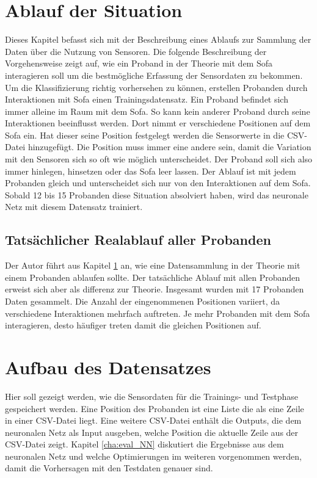 \section{Ablauf der Situation}
\label{sec:abl}
Dieses Kapitel befasst sich mit der Beschreibung eines Ablaufs zur Sammlung der Daten über die Nutzung von Sensoren. Die folgende Beschreibung der Vorgehensweise zeigt auf, wie ein Proband in der Theorie mit dem Sofa interagieren soll um die bestmögliche Erfassung der Sensordaten zu bekommen.
\newline
\newline
Um die Klassifizierung richtig vorhersehen zu können, erstellen Probanden durch Interaktionen mit Sofa einen Trainingsdatensatz. Ein Proband befindet sich immer alleine im Raum mit dem Sofa. So kann kein anderer Proband durch seine Interaktionen beeinflusst werden. Dort nimmt er verschiedene Positionen auf dem Sofa ein. Hat dieser seine Position festgelegt werden die Sensorwerte in die CSV-Datei hinzugefügt. Die Position muss immer eine andere sein, damit die Variation mit den Sensoren sich so oft wie möglich unterscheidet. Der Proband soll sich also immer hinlegen, hinsetzen oder das Sofa leer lassen. Der Ablauf ist mit jedem Probanden gleich und unterscheidet sich nur von den Interaktionen auf dem Sofa. Sobald 12 bis 15 Probanden diese Situation absolviert haben, wird das neuronale Netz mit diesem Datensatz trainiert.

\subsection{Tatsächlicher Realablauf aller Probanden}
\label{sub:real}
Der Autor führt aus Kapitel \ref{sec:abl} an, wie eine Datensammlung in der Theorie mit einem Probanden ablaufen sollte. Der tatsächliche Ablauf mit allen Probanden erweist sich aber als differenz zur Theorie. Insgesamt wurden mit 17 Probanden Daten gesammelt. Die Anzahl der eingenommenen Positionen variiert, da verschiedene Interaktionen mehrfach auftreten. Je mehr Probanden mit dem Sofa interagieren, desto häufiger treten damit die gleichen Positionen auf.

\section{Aufbau des Datensatzes}
Hier soll gezeigt werden, wie die Sensordaten für die Trainings- und Testphase gespeichert werden. Eine Position des Probanden ist eine Liste die als eine Zeile in einer CSV-Datei liegt. Eine weitere CSV-Datei enthält die Outputs, die dem neuronalen Netz als Input ausgeben, welche Position die aktuelle Zeile aus der CSV-Datei zeigt. Kapitel \ref{cha:eval_NN} diskutiert die Ergebnisse aus dem neuronalen Netz und welche Optimierungen im weiteren vorgenommen werden, damit die Vorhersagen mit den Testdaten genauer sind.

